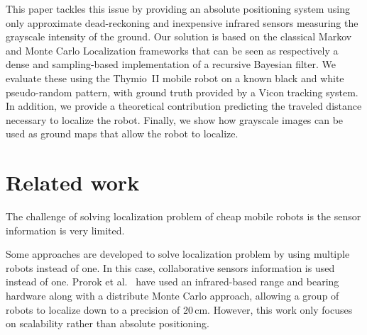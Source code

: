 \documentclass[letterpaper, 10pt, conference]{ieeeconf}
\begin{document}
This paper tackles this issue by providing an absolute positioning system using only approximate dead-reckoning and inexpensive infrared sensors measuring the grayscale intensity of the ground.
Our solution is based on the classical Markov and Monte Carlo Localization frameworks that can be seen as respectively a dense and sampling-based implementation of a recursive Bayesian filter.
We evaluate these using the Thymio~II mobile robot on a known black and white pseudo-random pattern, with ground truth provided by a Vicon tracking system.
In addition, we provide a theoretical contribution predicting the traveled distance necessary to localize the robot.
Finally, we show how grayscale images can be used as ground maps that allow the robot to localize.

\section{Related work}

The challenge of solving localization problem of cheap mobile robots is the sensor information is very limited.

Some approaches are developed to solve localization problem by using multiple robots instead of one.
In this case, collaborative sensors information is used instead of one.
Prorok et al.~\cite{prorok2012low} have used an infrared-based range and bearing hardware along with a distribute Monte Carlo approach, allowing a group of robots to localize down to a precision of 20\,cm.
However, this work only focuses on scalability rather than absolute positioning.


\end{document}
